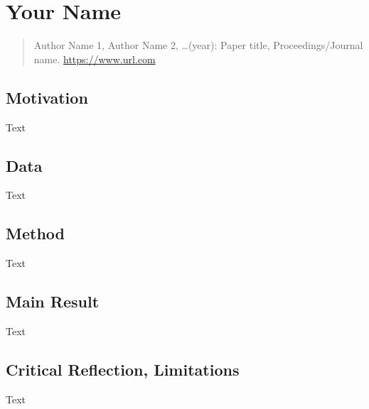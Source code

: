 \documentclass[smallheadings,english, DIV14]{scrartcl}
\begin{document}
\thispagestyle{empty}

\section*{Your Name}
%
\begin{quote}
  Author Name 1, Author Name 2, \ldots (year): Paper title, Proceedings/Journal name. \url{https://www.url.com}
\end{quote}

\subsection*{Motivation}
Text

\subsection*{Data}
Text

\subsection*{Method}
Text

\subsection*{Main Result}
Text

\subsection*{Critical Reflection, Limitations}
Text

\clearpage
\end{document}
